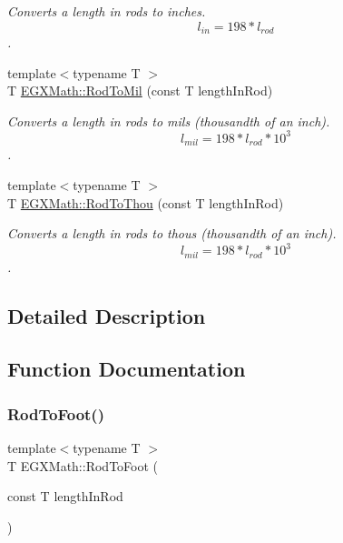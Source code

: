 \begin{DoxyCompactItemize}
\begin{DoxyCompactList}\small\item\em Converts a length in rods to inches. \[ l_{in}= 198 * l_{rod} \]. \end{DoxyCompactList}\item 
{\footnotesize template$<$typename T $>$ }\\T \mbox{\hyperlink{group___e_g_x_math-_conversions-_length_conversions-_imperial-_rod-_imperial_ga8458f45f5b02b4127d0d5626422b17c3}{E\+G\+X\+Math\+::\+Rod\+To\+Mil}} (const T length\+In\+Rod)
\begin{DoxyCompactList}\small\item\em Converts a length in rods to mils (thousandth of an inch). \[ l_{mil}=198 * l_{rod} * 10^{3} \]. \end{DoxyCompactList}\item 
{\footnotesize template$<$typename T $>$ }\\T \mbox{\hyperlink{group___e_g_x_math-_conversions-_length_conversions-_imperial-_rod-_imperial_ga1bd077740ba076ebf1e9e99cbeddf6cf}{E\+G\+X\+Math\+::\+Rod\+To\+Thou}} (const T length\+In\+Rod)
\begin{DoxyCompactList}\small\item\em Converts a length in rods to thous (thousandth of an inch). \[ l_{mil}= 198 * l_{rod} * 10^{3} \]. \end{DoxyCompactList}\end{DoxyCompactItemize}


\subsection{Detailed Description}


\subsection{Function Documentation}
\mbox{\label{group___e_g_x_math-_conversions-_length_conversions-_imperial-_rod-_imperial_ga5d9948f5cfc97d94698be96955a9df7f}} 
\subsubsection{\texorpdfstring{Rod\+To\+Foot()}{RodToFoot()}}
{\footnotesize\ttfamily template$<$typename T $>$ \\
T E\+G\+X\+Math\+::\+Rod\+To\+Foot (\begin{DoxyParamCaption}\item[{const T}]{length\+In\+Rod }\end{DoxyParamCaption})}



